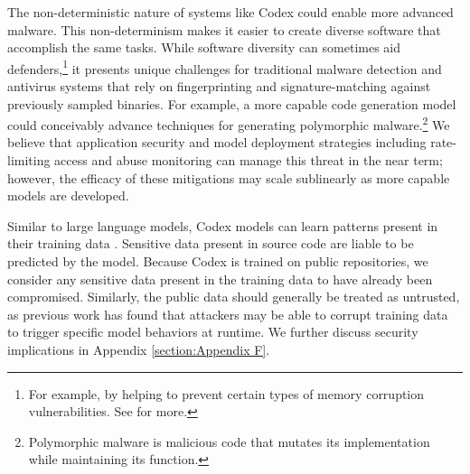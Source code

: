 The non-deterministic nature of systems like Codex could enable more advanced malware. This non-determinism makes it easier to create diverse software that accomplish the same tasks. While software diversity can sometimes aid defenders,\footnote{For example, by helping to prevent certain types of memory corruption vulnerabilities. See \citep{davis_2018} for more.} it presents unique challenges for traditional malware detection and antivirus systems that rely on fingerprinting and signature-matching against previously sampled binaries. For example, a more capable code generation model could conceivably advance techniques for generating polymorphic malware.\footnote{Polymorphic malware is malicious code that mutates its implementation while maintaining its function.} We believe that application security and model deployment strategies including rate-limiting access and abuse monitoring can manage this threat in the near term; however, the efficacy of these mitigations may scale sublinearly as more capable models are developed.

Similar to large language models, Codex models can learn patterns present in their training data \citep{carlini2020extracting}. Sensitive data present in source code are liable to be predicted by the model. Because Codex is trained on public repositories, we consider any sensitive data present in the training data to have already been compromised. Similarly, the public data should generally be treated as untrusted, as previous work \citep{goldblum2021dataset, autocompleteme} has found that attackers may be able to corrupt training data to trigger specific model behaviors at runtime. We further discuss security implications in Appendix \ref{section:Appendix F}.

